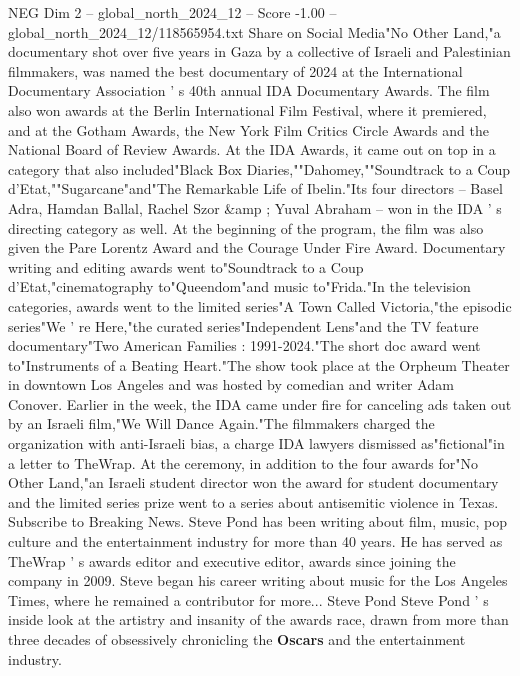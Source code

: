 \begin{textsample}{NEG Dim 2 – global\_north\_2024\_12 – Score -1.00 – global\_north\_2024\_12/118565954.txt}  \label{ex:f2_neg_165}
Share on Social Media"No Other Land,"a documentary shot over five years in Gaza by a collective of Israeli and Palestinian filmmakers, was named the best documentary of 2024 at the International Documentary Association ' s 40th annual IDA Documentary Awards.
The film also won awards at the Berlin International Film Festival, where it premiered, and at the Gotham Awards, the New York Film Critics Circle Awards and the National Board of Review Awards.
At the IDA Awards, it came out on top in a category that also included"Black Box Diaries,""Dahomey,""Soundtrack to a Coup d'Etat,""Sugarcane"and"The Remarkable Life of Ibelin."Its four directors -- Basel Adra, Hamdan Ballal, Rachel Szor \&amp ; Yuval Abraham -- won in the IDA ' s directing category as well.
At the beginning of the program, the film was also given the Pare Lorentz Award and the Courage Under Fire Award.
Documentary writing and editing awards went to"Soundtrack to a Coup d'Etat,"cinematography to"Queendom"and music to"Frida."In the television categories, awards went to the limited series"A Town Called Victoria,"the episodic series"We ' re Here,"the curated series"Independent Lens"and the TV feature documentary"Two American Families : 1991-2024."The short doc award went to"Instruments of a Beating Heart."The show took place at the Orpheum Theater in downtown Los Angeles and was hosted by comedian and writer Adam Conover.
Earlier in the week, the IDA came under fire for canceling ads taken out by an Israeli film,"We Will Dance Again."The filmmakers charged the organization with anti-Israeli bias, a charge IDA lawyers dismissed as"fictional"in a letter to TheWrap.
At the ceremony, in addition to the four awards for"No Other Land,"an Israeli student director won the award for student documentary and the limited series prize went to a series about antisemitic violence in Texas.
Subscribe to Breaking News.
Steve Pond has been writing about film, music, pop culture and the entertainment industry for more than 40 years.
He has served as TheWrap ' s awards editor and executive editor, awards since joining the company in 2009.
Steve began his career writing about music for the Los Angeles Times, where he remained a contributor for more...
Steve Pond Steve Pond ' s inside look at the artistry and insanity of the awards race, drawn from more than three decades of obsessively chronicling the \textbf{Oscars} and the entertainment industry.

\end{textsample}
